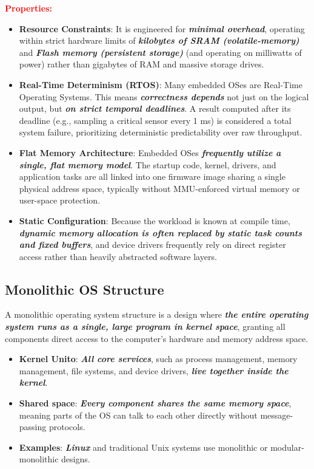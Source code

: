 \textbf{\textcolor{red}{Properties: }}
\begin{itemize}
    \item \textbf{Resource Constraints}: It is engineered for \textbf{\textit{minimal overhead}}, operating within strict hardware limits of \textbf{\textit{kilobytes of SRAM (volatile-memory)}} and \textbf{\textit{Flash memory (persistent storage)}} (and operating on milliwatts of power) rather than gigabytes of RAM and massive storage drives.
    \item \textbf{Real-Time Determinism (RTOS)}: Many embedded OSes are Real-Time Operating Systems. This means \textbf{\textit{correctness depends}} not just on the logical output, but \textbf{\textit{on strict temporal deadlines}}. A result computed after its deadline (e.g., sampling a critical sensor every 1 ms) is considered a total system failure, prioritizing deterministic predictability over raw throughput.
    \item \textbf{Flat Memory Architecture}: Embedded OSes \textbf{\textit{frequently utilize a single, flat memory model}}. The startup code, kernel, drivers, and application tasks are all linked into one firmware image sharing a single physical address space, typically without MMU-enforced virtual memory or user-space protection.
    \item \textbf{Static Configuration}: Because the workload is known at compile time, \textbf{\textit{dynamic memory allocation is often replaced by static task counts and fixed buffers}}, and device drivers frequently rely on direct register access rather than heavily abstracted software layers.   
\end{itemize}

\subsection{Monolithic OS Structure}
A monolithic operating system structure is a design where \textbf{\textit{the entire operating system runs as a single, large program in kernel space}}, granting all components direct access to the computer's hardware and memory address space.

\begin{itemize}
    \item \textbf{Kernel Unito}: \textbf{\textit{All core services}}, such as process management, memory management, file systems, and device drivers, \textbf{\textit{live together inside the kernel}}.
    \item \textbf{Shared space}: \textbf{\textit{Every component shares the same memory space}}, meaning parts of the OS can talk to each other directly without message-passing protocols.
    \item  \textbf{Examples}: \textbf{\textit{Linux}} and traditional Unix systems use monolithic or modular-monolithic designs.
\end{itemize}

